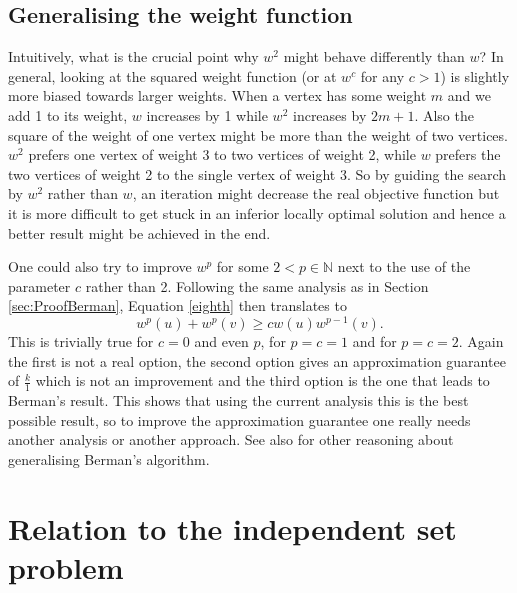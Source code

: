 \subsection{Generalising the weight function}\label{subsec:DiscBerman2}

Intuitively, what is the crucial point why $w^2$ might behave differently than $w$? In general, looking at the squared weight function (or at $w^c$ for any $c>1$) is slightly more biased towards larger weights. When a vertex has some weight $m$ and we add 1 to its weight, $w$ increases by 1 while $w^2$ increases by $2m+1$. Also the square of the weight of one vertex might be more than the weight of two vertices. $w^2$ prefers one vertex of weight 3 to two vertices of weight 2, while $w$ prefers the two vertices of weight 2 to the single vertex of weight 3. So by guiding the search by $w^2$ rather than $w$, an iteration might decrease the real objective function but it is more difficult to get stuck in an inferior locally optimal solution and hence a better result might be achieved in the end.

One could also try to improve $w^p$ for some $2 < p \in \mathbb{N}$ next to the use of the parameter $c$ rather than 2. Following the same analysis as in Section \ref{sec:ProofBerman}, Equation \eqref{eighth} then translates to
%
\begin{equation*}
w^p(u) + w^p(v) \geq c w(u) w^{p-1}(v).
\end{equation*}
%
This is trivially true for $c = 0$ and even $p$, for $p = c = 1$ and for $p = c = 2$. Again the first is not a real option, the second option gives an approximation guarantee of $\frac{k}{1}$ which is not an improvement and the third option is the one that leads to Berman's result. %
This shows that using the current analysis this is the best possible result, so to improve the approximation guarantee one really needs another analysis or another approach. See also \cite{BermanWeighted2} for other reasoning about generalising Berman's algorithm.

\section{Relation to the independent set problem}\label{sec:IS}

